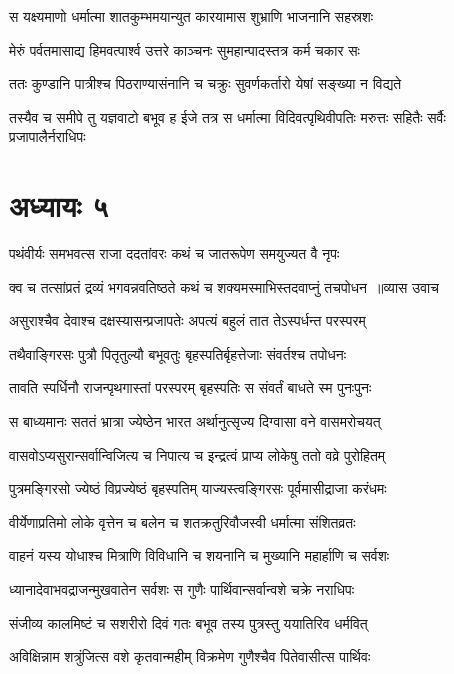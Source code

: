 \twolineshloka
{स यक्ष्यमाणो धर्मात्मा शातकुम्भमयान्युत}
{कारयामास शुभ्राणि भाजनानि सहस्रशः}


\twolineshloka
{मेरुं पर्वतमासाद्य हिमवत्पार्श्व उत्तरे}
{काञ्चनः सुमहान्पादस्तत्र कर्म चकार सः}


\twolineshloka
{ततः कुण्डानि पात्रीश्च पिठराण्यासंनानि च}
{चक्रुः सुवर्णकर्तारो येषां सङ्ख्या न विद्यते}


\threelineshloka
{तस्यैव च समीपे तु यज्ञवाटो बभूव ह}
{ईजे तत्र स धर्मात्मा विदिवत्पृथिवीपतिः}
{मरुत्तः सहितैः सर्वैः प्रजापालैर्नराधिपः}


\chapter{अध्यायः ५}
\twolineshloka
{पथंवीर्यः समभवत्स राजा ददतांवरः}
{कथं च जातरूपेण समयुज्यत वै नृपः}


\threelineshloka
{क्व च तत्सांप्रतं द्रव्यं भगवन्नवतिष्ठते}
{कथं च शक्यमस्माभिस्तदवाप्नुं तचपोधन ॥व्यास उवाच}
{}


\twolineshloka
{असुराश्चैव देवाश्च दक्षस्यासन्प्रजापतेः}
{अपत्यं बहुलं तात तेऽस्पर्धन्त परस्परम्}


\twolineshloka
{तथैवाङ्गिरसः पुत्रौ पितृतुल्यौ बभूवतुः}
{बृहस्पतिर्बृहत्तेजाः संवर्तश्च तपोधनः}


\twolineshloka
{तावति स्पर्धिनौ राजन्पृथगास्तां परस्परम्}
{बृहस्पतिः स संवर्तं बाधते स्म पुनःपुनः}


\twolineshloka
{स बाध्यमानः सततं भ्रात्रा ज्येष्ठेन भारत}
{अर्थानुत्सृज्य दिग्वासा वने वासमरोचयत्}


\twolineshloka
{वासवोऽप्यसुरान्सर्वान्विजित्य च निपात्य च}
{इन्द्रत्वं प्राप्य लोकेषु ततो वव्रे पुरोहितम्}


\twolineshloka
{पुत्रमङ्गिरसो ज्येष्ठं विप्रज्येष्ठं बृहस्पतिम्}
{याज्यस्त्वङ्गिरसः पूर्वमासीद्राजा करंधमः}


\threelineshloka
{वीर्येणाप्रतिमो लोके वृत्तेन च बलेन च}
{शतक्रतुरिवौजस्वी धर्मात्मा संशितव्रतः}
{}


\twolineshloka
{वाहनं यस्य योधाश्च मित्राणि विविधानि च}
{शयनानि च मुख्यानि महार्हाणि च सर्वशः}


\twolineshloka
{ध्यानादेवाभवद्राजन्मुखवातेन सर्वशः}
{स गुणैः पार्थिवान्सर्वान्वशे चक्रे नराधिपः}


\twolineshloka
{संजीव्य कालमिष्टं च सशरीरो दिवं गतः}
{बभूव तस्य पुत्रस्तु ययातिरिव धर्मवित्}


\twolineshloka
{अविक्षिन्नाम शत्रुंजित्स वशे कृतवान्महीम्}
{विक्रमेण गुणैश्चैव पितेवासीत्स पार्थिवः}


